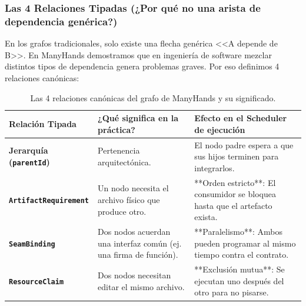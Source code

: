 \documentclass[11pt,a4paper]{article}
\begin{document}
\subsubsection{Las 4 Relaciones Tipadas (¿Por qué no una arista de dependencia genérica?)}
En los grafos tradicionales, solo existe una flecha genérica <<A depende de B>>. En ManyHands demostramos que en ingeniería de software mezclar distintos tipos de dependencia genera problemas graves. Por eso definimos 4 relaciones canónicas:

\begin{table}[htbp]
  \centering
  \caption{Las 4 relaciones canónicas del grafo de ManyHands y su significado.}
  \small
  \begin{tabularx}{\textwidth}{@{}l p{4.5cm} X@{}}
    \toprule
    \textbf{Relación Tipada} & \textbf{¿Qué significa en la práctica?} & \textbf{Efecto en el Scheduler de ejecución} \\
    \midrule
    \textbf{Jerarquía (\texttt{parentId})} & Pertenencia arquitectónica. & El nodo padre espera a que sus hijos terminen para integrarlos. \\
    \textbf{\texttt{ArtifactRequirement}} & Un nodo necesita el archivo físico que produce otro. & **Orden estricto**: El consumidor se bloquea hasta que el artefacto exista. \\
    \textbf{\texttt{SeamBinding}} & Dos nodos acuerdan una interfaz común (ej. una firma de función). & **Paralelismo**: Ambos pueden programar al mismo tiempo contra el contrato. \\
    \textbf{\texttt{ResourceClaim}} & Dos nodos necesitan editar el mismo archivo. & **Exclusión mutua**: Se ejecutan uno después del otro para no pisarse. \\
    \bottomrule
  \end{tabularx}
\end{table}
\end{document}
